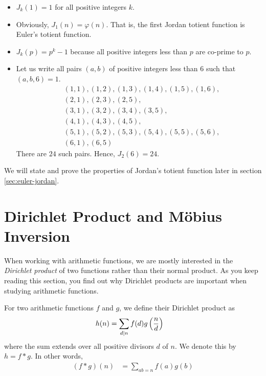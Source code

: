 	\begin{example}
		$ $
		\begin{itemize}
			\item $J_k(1)=1$ for all positive integers $k$.
			\item Obviously, $J_1(n)=\varphi(n)$. That is, the first Jordan totient function is Euler's totient function.
			\item $J_k(p)=p^k - 1 $ because all positive integers less than $p$ are co-prime to $p$.
			\item Let us write all pairs $(a,b)$ of positive integers less than $6$ such that $(a,b,6)=1$.
				\begin{align*}
					&(1,1), (1,2), (1, 3), (1, 4), (1, 5), (1,6),\\
					&(2,1), (2,3), (2,5),\\
					&(3,1), (3,2), (3,4), (3,5),\\
					&(4,1), (4,3), (4,5),\\
					&(5,1), (5,2), (5,3), (5,4), (5,5), (5,6),\\
					&(6,1), (6,5)
				\end{align*}
			There are $24$ such pairs. Hence, $J_2(6)=24$.
		\end{itemize}
	\end{example}


We will state and prove the properties of Jordan's totient function later in section \ref{sec:euler-jordan}.
\section{Dirichlet Product and M\" {o}bius Inversion}\label{sec:dirichletmobius}
When working with arithmetic functions, we are mostly interested in the \textit{Dirichlet product} of two functions rather than their normal product. As you keep reading this section, you find out why Dirichlet products are important when studying arithmetic functions.
	\begin{definition}
		For two arithmetic functions $f$ and $g$, we define their Dirichlet product as
			\begin{align*}
				h(n)
					& =\sum_{d\mid n}f(d)g\left(\frac nd\right)
			\end{align*}
		where the sum extends over all positive divisors $d$ of $n$. We denote this by $h=f\ast g$. In other words,
			\begin{align*}
				(f\ast g)(n)
					& =\sum_{ab=n}f(a)g(b)
			\end{align*}
	\end{definition}

